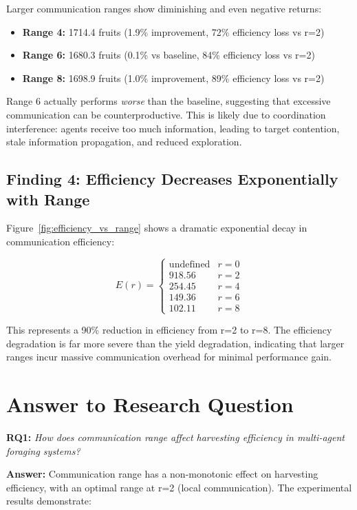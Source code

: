 Larger communication ranges show diminishing and even negative returns:

\begin{itemize}
    \item \textbf{Range 4:} 1714.4 fruits (1.9\% improvement, 72\% efficiency loss vs r=2)
    \item \textbf{Range 6:} 1680.3 fruits (0.1\% vs baseline, 84\% efficiency loss vs r=2)
    \item \textbf{Range 8:} 1698.9 fruits (1.0\% improvement, 89\% efficiency loss vs r=2)
\end{itemize}

Range 6 actually performs \emph{worse} than the baseline, suggesting that excessive communication can be counterproductive. This is likely due to coordination interference: agents receive too much information, leading to target contention, stale information propagation, and reduced exploration.

\subsection{Finding 4: Efficiency Decreases Exponentially with Range}

Figure~\ref{fig:efficiency_vs_range} shows a dramatic exponential decay in communication efficiency:

\begin{equation}
E(r) = \begin{cases}
\text{undefined} & r = 0 \\
918.56 & r = 2 \\
254.45 & r = 4 \\
149.36 & r = 6 \\
102.11 & r = 8
\end{cases}
\end{equation}

This represents a 90\% reduction in efficiency from r=2 to r=8. The efficiency degradation is far more severe than the yield degradation, indicating that larger ranges incur massive communication overhead for minimal performance gain.

\section{Answer to Research Question}

\textbf{RQ1:} \emph{How does communication range affect harvesting efficiency in multi-agent foraging systems?}

\textbf{Answer:} Communication range has a non-monotonic effect on harvesting efficiency, with an optimal range at r=2 (local communication). The experimental results demonstrate:

